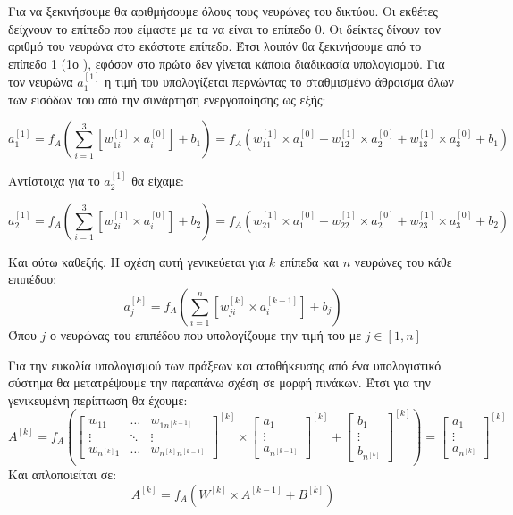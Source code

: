 Για να ξεκινήσουμε θα αριθμήσουμε όλους τους νευρώνες του δικτύου. Οι εκθέτες δείχνουν
το επίπεδο που είμαστε με τα  να είναι το επίπεδο 0. Οι δείκτες δίνουν τον αριθμό του
νευρώνα στο εκάστοτε επίπεδο. Έτσι λοιπόν θα ξεκινήσουμε από το επίπεδο 1 (1ο ),
εφόσον στο πρώτο δεν γίνεται κάποια διαδικασία υπολογισμού. Για τον νευρώνα $a_1^{[1]}$
η τιμή του υπολογίζεται περνώντας το σταθμισμένο άθροισμα όλων των εισόδων του από
την συνάρτηση ενεργοποίησης ως εξής:
\begin{changemargin}{-1cm}{-1cm}
    $$a_1^{[1]}=f_A\left(\sum\limits_{i=1}^3\left[ w_{1i}^{[1]}\times a_i^{[0]}\right]+b_1\right)=f_A\left( w_{11}^{[1]}\times a_1^{[0]}+w_{12}^{[1]}\times a_2^{[0]}+w_{13}^{[1]}\times a_3^{[0]}+b_1\right)$$
\end{changemargin}
Αντίστοιχα για το $a_2^{[1]}$
θα είχαμε:
\begin{changemargin}{-1cm}{-1cm}
    $$a_2^{[1]}=f_A\left(\sum\limits_{i=1}^3\left[ w_{2i}^{[1]}\times a_i^{[0]}\right]+b_2\right)=f_A\left( w_{21}^{[1]}\times a_1^{[0]}+w_{22}^{[1]}\times a_2^{[0]}+w_{23}^{[1]}\times a_3^{[0]}+b_2\right)$$
\end{changemargin}
Και ούτω καθεξής. Η σχέση αυτή γενικεύεται για $k$ επίπεδα και $n$ νευρώνες του κάθε
επιπέδου:
$$a_j^{[k]}=f_A\left(\sum\limits_{i=1}^n\left[ w_{ji}^{[k]}\times a_i^{[k-1]}\right]+b_j\right)$$
Όπου $j$ ο νευρώνας του επιπέδου που υπολογίζουμε την τιμή του με $j \in [1, n]$

Για την ευκολία υπολογισμού των πράξεων και αποθήκευσης από ένα υπολογιστικό σύστημα
θα μετατρέψουμε την παραπάνω σχέση σε μορφή πινάκων. Έτσι για την γενικευμένη
περίπτωση θα έχουμε:
$$
A^{[k]}=f_A\left(
\begin{bmatrix}
    w_{11}     & \dots     & w_{1n^{[k-1]}} \\
    \vdots     & \ddots    & \vdots \\
    w_{n^{[k]}1}   & \dots     & w_{n^{[k]}n^{[k-1]}}
\end{bmatrix}
^{[k]}
\times
\begin{bmatrix}
    a_1 \\
    \vdots \\
    a_{n^{[k-1]}}
\end{bmatrix}
^{[k]}
+
\begin{bmatrix}
    b_1 \\
    \vdots \\
    b_{n^{[k]}}
\end{bmatrix}
^{[k]}
\right)
=
\begin{bmatrix}
    a_1 \\
    \vdots \\
    a_{n^{[k]}}
\end{bmatrix}
^{[k]}
$$
Και απλοποιείται σε:
$$A^{[k]}=f_A(W^{[k]}\times A^{[k-1]}+B^{[k]})$$

